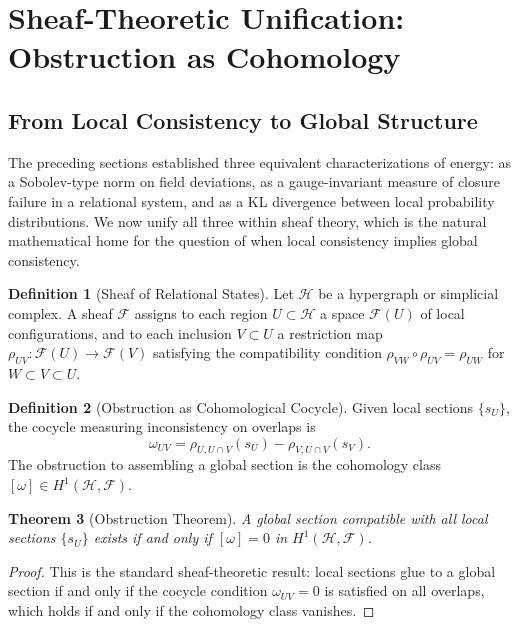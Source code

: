 \documentclass[12pt,a4paper,openany]{book}
\theoremstyle{plain}
\newtheorem{theorem}{Theorem}[chapter]
\theoremstyle{definition}
\newtheorem{definition}[theorem]{Definition}
\theoremstyle{remark}
\begin{document}
\section{Sheaf-Theoretic Unification: Obstruction as Cohomology}
\label{sec:sheaf_unification}

\subsection{From Local Consistency to Global Structure}

The preceding sections established three equivalent characterizations of energy: as a Sobolev-type norm on field deviations, as a gauge-invariant measure of closure failure in a relational system, and as a KL divergence between local probability distributions. We now unify all three within sheaf theory, which is the natural mathematical home for the question of when local consistency implies global consistency.

\begin{definition}[Sheaf of Relational States]
Let $\mathcal{H}$ be a hypergraph or simplicial complex. A sheaf $\mathcal{F}$ assigns to each region $U \subset \mathcal{H}$ a space $\mathcal{F}(U)$ of local configurations, and to each inclusion $V \subset U$ a restriction map $\rho_{UV} : \mathcal{F}(U) \to \mathcal{F}(V)$ satisfying the compatibility condition $\rho_{VW} \circ \rho_{UV} = \rho_{UW}$ for $W \subset V \subset U$.
\end{definition}

\begin{definition}[Obstruction as Cohomological Cocycle]
Given local sections $\{s_U\}$, the cocycle measuring inconsistency on overlaps is
\[
\omega_{UV} = \rho_{U,U\cap V}(s_U) - \rho_{V,U\cap V}(s_V).
\]
The obstruction to assembling a global section is the cohomology class $[\omega] \in H^1(\mathcal{H},\mathcal{F})$.
\end{definition}

\begin{theorem}[Obstruction Theorem]
A global section compatible with all local sections $\{s_U\}$ exists if and only if $[\omega] = 0$ in $H^1(\mathcal{H},\mathcal{F})$.
\end{theorem}

\begin{proof}
This is the standard sheaf-theoretic result: local sections glue to a global section if and only if the cocycle condition $\omega_{UV} = 0$ is satisfied on all overlaps, which holds if and only if the cohomology class vanishes.
\end{proof}
\end{document}
